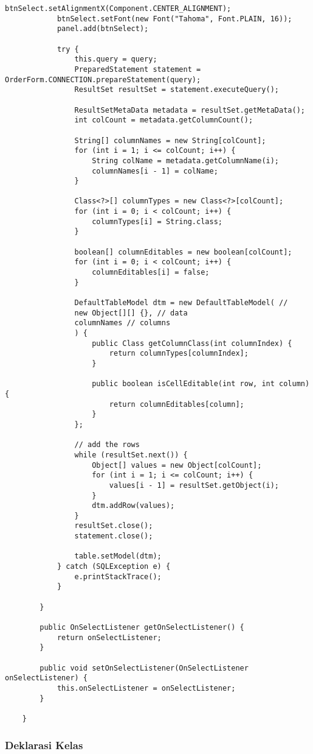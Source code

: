 \begin{lstlisting}[style=JavaStyle]
			btnSelect.setAlignmentX(Component.CENTER_ALIGNMENT);
			btnSelect.setFont(new Font("Tahoma", Font.PLAIN, 16));
			panel.add(btnSelect);
			
			try {
				this.query = query;
				PreparedStatement statement = OrderForm.CONNECTION.prepareStatement(query);
				ResultSet resultSet = statement.executeQuery();
				
				ResultSetMetaData metadata = resultSet.getMetaData();
				int colCount = metadata.getColumnCount();
				
				String[] columnNames = new String[colCount];
				for (int i = 1; i <= colCount; i++) {
					String colName = metadata.getColumnName(i);
					columnNames[i - 1] = colName;
				}
				
				Class<?>[] columnTypes = new Class<?>[colCount];
				for (int i = 0; i < colCount; i++) {
					columnTypes[i] = String.class;
				}
				
				boolean[] columnEditables = new boolean[colCount];
				for (int i = 0; i < colCount; i++) {
					columnEditables[i] = false;
				}
				
				DefaultTableModel dtm = new DefaultTableModel( //
				new Object[][] {}, // data
				columnNames // columns
				) {
					public Class getColumnClass(int columnIndex) {
						return columnTypes[columnIndex];
					}
					
					public boolean isCellEditable(int row, int column) {
						return columnEditables[column];
					}
				};
				
				// add the rows
				while (resultSet.next()) {
					Object[] values = new Object[colCount];
					for (int i = 1; i <= colCount; i++) {
						values[i - 1] = resultSet.getObject(i);
					}
					dtm.addRow(values);
				}
				resultSet.close();
				statement.close();
				
				table.setModel(dtm);
			} catch (SQLException e) {
				e.printStackTrace();
			}
			
		}
		
		public OnSelectListener getOnSelectListener() {
			return onSelectListener;
		}
		
		public void setOnSelectListener(OnSelectListener onSelectListener) {
			this.onSelectListener = onSelectListener;
		}
		
	}
\end{lstlisting}

\subsubsection{Deklarasi Kelas}

